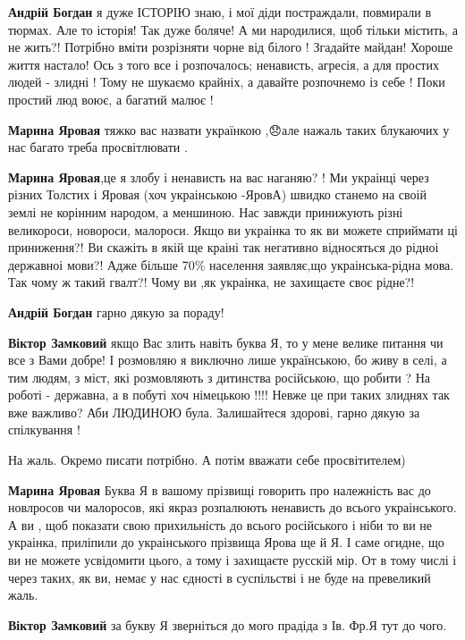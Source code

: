 \begin{itemize}
\begin{itemize}
\textbf{Андрій Богдан} я дуже ІСТОРІЮ знаю, і мої діди постраждали, повмирали в
тюрмах. Але то історія! Так дуже боляче! А ми народилися, щоб тільки містить, а
не жить?! Потрібно вміти розрізняти чорне від білого ! Згадайте майдан! Хороше
життя настало! Ось з того все і розпочалось; ненависть, агресія, а для простих
людей - злидні ! Тому не шукаємо крайніх, а давайте розпочнемо із себе ! Поки
простий люд воює, а багатий малює !

\textbf{Марина Яровая} тяжко вас назвати українкою ,😞але нажаль таких блукаючих у нас багато треба просвітлювати .


\textbf{Марина Яровая},це я злобу і ненависть на вас наганяю? ! Ми украінці
через різних Толстих і Яровая (хоч украінською -ЯровА) швидко станемо на своій
землі не корінним народом, а меншиною. Нас завжди принижують різні великороси,
новороси, малороси. Якщо ви украінка то як ви можете сприймати ці приниження?!
Ви скажіть в якій ще краіні так негативно відносяться до рідноі державноі
мови?! Адже більше 70\% населення заявляє,що украінська-рідна мова. Так чому ж
такий гвалт?! Чому ви ,як украінка, не захищаєте своє рідне?!

\textbf{Андрій Богдан} гарно дякую за пораду!

\textbf{Віктор Замковий} якщо Вас злить навіть буква Я, то у мене велике
питання чи все з Вами добре! І розмовляю я виключно лише українською, бо живу в
селі, а тим людям, з міст, які розмовляють з дитинства російською, що робити ?
На роботі - державна, а в побуті хоч німецькою !!!! Невже це при таких злиднях
так вже важливо? Аби ЛЮДИНОЮ була. Залишайтеся здорові, гарно дякую за
спілкування !

На жаль. Окремо писати потрібно. А потім вважати себе просвітителем)

\textbf{Марина Яровая} Буква Я в вашому прізвищі говорить про належність вас до новлросов чи малоросов, які якраз розпалюють ненависть до всього украінського. А ви , щоб показати свою прихильність до всього російського і ніби то ви не украінка, приліпили до украінського прізвища Ярова ще й Я. І саме огидне, що ви не можете усвідомити цього, а тому і захищаєте русскій мір. От в тому числі і через таких, як ви, немає у нас єдності в суспільстві і не буде на превеликий жаль.

\textbf{Віктор Замковий} за букву Я зверніться до мого прадіда з Ів. Фр.Я тут до чого.


\end{itemize}
\end{itemize}

